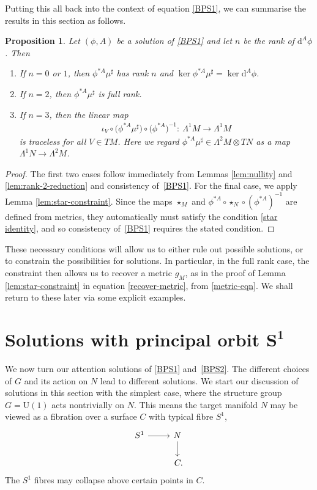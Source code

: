 \documentclass[pdftex]{sigma}
\newcommand{\U}{{\mathrm{U}}}
\newcommand{\1}{{\mathbb{1}}}
\def \d{\mathrm{d}}
\numberwithin{equation}{section}
\newtheorem{Proposition}[Theorem]{Proposition}
 { \theoremstyle{definition}
\newtheorem{Definition}[Theorem]{Definition}
\newtheorem{Note}[Theorem]{Note}
\newtheorem{Example}[Theorem]{Example}
\newtheorem{Remark}[Theorem]{Remark} }
\begin{document}
Putting this all back into the context of equation \eqref{BPS1}, we can summarise the results in this section as follows.
\begin{Proposition}\label{prop:nec-for-BPS1}
 Let $(\phi,A)$ be a solution of \eqref{BPS1} and let $n$ be the rank of $\d^A\phi$. Then
 \begin{enumerate}\itemsep=0pt
 \item[$1.$] If $n=0$ or $1$, then $\phi^{\ast A}\mu^\sharp$ has rank $n$ and $\ker\phi^{\ast A}\mu^\sharp=\ker\d^A\phi$.
 \item[$2.$] If $n=2$, then $\phi^{\ast A}\mu^\sharp$ is full rank.
 \item[$3.$] If $n=3$, then the linear map
\begin{align*}
 \iota_V\circ\big(\phi^{\ast A}\mu^\sharp\big)\circ\big(\phi^{\ast A}\big)^{-1}\colon \ \Lambda^1M\to\Lambda^1M
\end{align*}
is traceless for all $V\in TM$. Here we regard $\phi^{\ast A}\mu^\sharp\in\Lambda^2M\otimes TN$ as a map $\Lambda^1N\to\Lambda^2M$.
 \end{enumerate}
\end{Proposition}
\begin{proof}
 The first two cases follow immediately from Lemmas \ref{lem:nullity} and \ref{lem:rank-2-reduction} and consistency of~\eqref{BPS1}. For the final case, we apply Lemma \ref{lem:star-constraint}. Since the maps $\star_{M}$ and $\phi^{\ast A}\circ\star_{N}\circ(\phi^{\ast A})^{-1}$ are defined from metrics, they automatically must satisfy the condition \eqref{star identity}, and so consistency of~\eqref{BPS1} requires the stated condition.
\end{proof}

These necessary conditions will allow us to either rule out possible solutions, or to constrain the possibilities for solutions. In particular, in the full rank case, the constraint then allows us to recover a metric $g_M$, as in the proof of Lemma \ref{lem:star-constraint} in equation \eqref{recover-metric}, from \eqref{metric-eqn}. We shall return to these later via some explicit examples.

\section[Solutions with principal orbit S\^{}1]{Solutions with principal orbit $\boldsymbol{S^1}$}\label{sec:princ-orbit-S1}

We now turn our attention solutions of \eqref{BPS1} and~\eqref{BPS2}. The different choices of $G$ and its action on $N$ lead to different solutions. We start our discussion of solutions in this section with the simplest case, where the structure group $G=\U(1)$ acts nontrivially on $N$. This means the target manifold $N$ may be viewed as a fibration over a surface $C$ with typical fibre $S^1$,
\begin{equation*}%
\begin{tikzcd}
S^1\arrow{r}{}&N\arrow{d}{}\\
&\hphantom{.}C.
\end{tikzcd}
\end{equation*}
The $S^1$ fibres may collapse above certain points in $C$.
\end{document}
